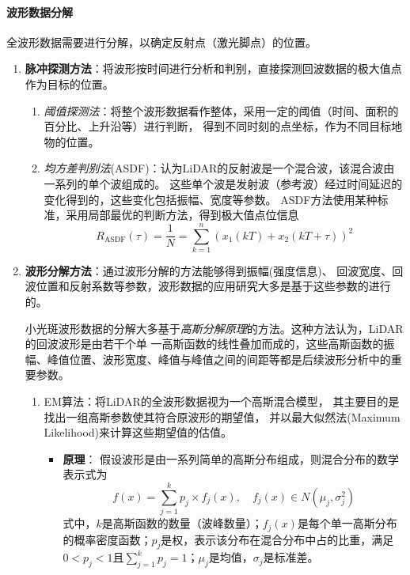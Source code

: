 \paragraph{波形数据分解}
全波形数据需要进行分解，以确定反射点（激光脚点）的位置。
\begin{enumerate}
	\item {\bfseries\kaishu 脉冲探测方法}：将波形按时间进行分析和判别，直接探测回波数据的极大值点作为目标的位置。
		\begin{enumerate}
			\item \textit{阈值探测法}：将整个波形数据看作整体，采用一定的阈值（时间、面积的百分比、上升沿等）进行判断，
				得到不同时刻的点坐标，作为不同目标地物的位置。
			\item \textit{均方差判别法}(ASDF)：认为LiDAR的反射波是一个混合波，该混合波由一系列的单个波组成的。
				这些单个波是发射波（参考波）经过时间延迟的变化得到的，这些变化包括振幅、宽度等参数。
				ASDF方法使用某种标准，采用局部最优的判断方法，得到极大值点位信息
				\begin{equation}
				R_{\text{ASDF}}(\tau) = \dfrac{1}{N} = \sum_{k=1}^{n} \left( x_1 (kT) + x_2 (kT + \tau) \right)^2
				\end{equation}
		\end{enumerate}
	\item {\bfseries\kaishu 波形分解方法}：通过波形分解的方法能够得到振幅(强度信息)、
		回波宽度、回波位置和反射系数等参数，波形数据的应用研究大多是基于这些参数的进行的。
		
		小光斑波形数据的分解大多基于\textit{高斯分解原理}的方法。这种方法认为，LiDAR的回波波形是由若干个单 一高斯函数的线性叠加而成的，这些高斯函数的振幅、峰值位置、波形宽度、峰值与峰值之间的间距等都是后续波形分析中的重要参数。
			\begin{enumerate}
				\item {\kaishu EM算法}：将LiDAR的全波形数据视为一个高斯混合模型，
					其主要目的是找出一组高斯参数使其符合原波形的期望值，
					并以最大似然法(Maximum Likelihood)来计算这些期望值的估值。
					\begin{itemize}
						\item \textbf{原理}：
							假设波形是由一系列简单的高斯分布组成，则混合分布的数学表示式为
							\begin{equation}
							f(x) = \sum_{j=1}^{k}p_j \times f_j(x),\quad f_j(x) \in N(\mu_j,\sigma_j^2)
							\end{equation}
							式中，$ k $是高斯函数的数量（波峰数量）；$ f_j(x) $是每个单一高斯分布的概率密度函数；$ p_j $是权，表示该分布在混合分布中占的比重，满足$ 0 < p_j < 1 $且$ \displaystyle{\sum_{j=1}^{k}p_j = 1} $；$ \mu_j $是均值，$ \sigma_j $是标准差。
							

\end{itemize}
\end{enumerate}
\end{enumerate}
